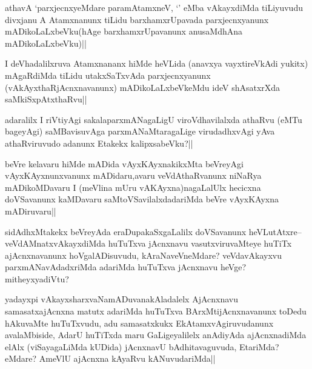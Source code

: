 
\begin{artha}
athavA `parxjecnxyeMdare paramAtamxneV, `\stext' eMba vAkayxdiMda tiLiyuvudu divxjanu A Atamxnanunx tiLidu barxhamxrUpavada parxjecnxyanunx mADikoLaLxbeVku(hAge barxhamxrUpavanunx anusaMdhAna mADikoLaLxbeVku)||
\end{artha}


\begin{artha}
I deVhadalilxruva Atamxnananx hiMde heVLida (anavxya vayxtireVkAdi yukitx) mAgaRdiMda tiLidu utakxSaTxvAda parxjecnxyanunx (vAkAyxthaRjAcnxnavanunx) mADikoLaLxbeVkeMdu ideV shAsatxrXda saMkiSxpAtxthaRvu||
\end{artha}

\begin{artha}
adaralilx I riVtiyAgi sakalaparxmANagaLigU viroVdhavilalxda athaRvu (eMTu bageyAgi) saMBavisuvAga parxmANaMtaragaLige virudadhxvAgi yAva athaRviruvudo adanunx Etakekx kalipxsabeVku?||
\end{artha}


\begin{artha}
beVre kelavaru hiMde mADida vAyxKAyxnakikxMta beVreyAgi vAyxKAyxnunxvanunx mADidaru,avaru veVdAthaRvanunx niNaRya mADikoMDavaru I (meVlina mUru vAKAyxna)nagaLalUlx hecicxna doVSavanunx kaMDavaru saMtoVSavilalxdadariMda beVre vAyxKAyxna mADiruvaru||
\end{artha}

\begin{artha}
sidAdhxMtakekx beVreyAda eraDupakaSxgaLalilx doVSavanunx heVLutAtxre-- veVdAMnatxvAkayxdiMda huTuTxva jAcnxnavu vasutxviruvaMteye huTiTx ajAcnxnavanunx hoVgalADisuvudu, kAraNaveVneMdare? veVdavAkayxvu parxmANavAdadxriMda adariMda huTuTxva jAcnxnavu heVge? mitheyxyadiVtu?
\end{artha}


\begin{artha}
yadayxpi vAkayxsharxvaNamADuvanakAladalelx AjAcnxnavu samasatxajAcnxna matutx adariMda huTuTxva BArxMtijAcnxnavanunx toDedu hAkuvaMte huTuTxvudu, adu samasatxkukx EkAtamxvAgiruvudanunx avalaMbiside, AdarU huTiTxda maru GaLigeyalilelx anAdiyAda ajAcnxnadiMda elAlx (viSayagaLiMda kUDida) jAcnxnavU bAdhitavaguvuda, EtariMda? eMdare? AmeVlU ajAcnxna kAyaRvu kANuvudariMda||
\end{artha}

